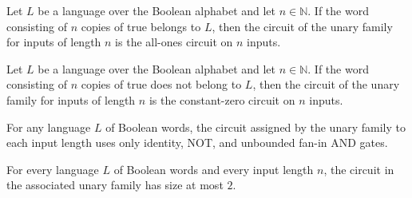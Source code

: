 \begin{theorem}
\label{BoolCircuit.unaryFamily_circuit_of_mem}
\leanok
{}
Let $L$ be a language over the Boolean alphabet and let $n\in\mathbb N$. If the word
consisting of $n$ copies of true belongs to $L$, then the circuit of the unary family
for inputs of length $n$ is the all-ones circuit on $n$ inputs.
\end{theorem}

\begin{theorem}
\label{BoolCircuit.unaryFamily_circuit_of_not_mem}
\leanok
{}
Let $L$ be a language over the Boolean alphabet and let $n\in\mathbb N$. If the word
consisting of $n$ copies of true does not belong to $L$, then the circuit of the unary
family for inputs of length $n$ is the constant-zero circuit on $n$ inputs.
\end{theorem}

\begin{theorem}
\label{BoolCircuit.unaryFamily_onlyUsesGates}
\leanok
{}
For any language $L$ of Boolean words, the circuit assigned by the unary family to each
input length uses only identity, NOT, and unbounded fan-in AND gates.
\end{theorem}

\begin{theorem}
\label{BoolCircuit.unaryFamily_size_le}
\leanok
{}
For every language $L$ of Boolean words and every input length $n$, the circuit in the
associated unary family has size at most $2$.
\end{theorem}

